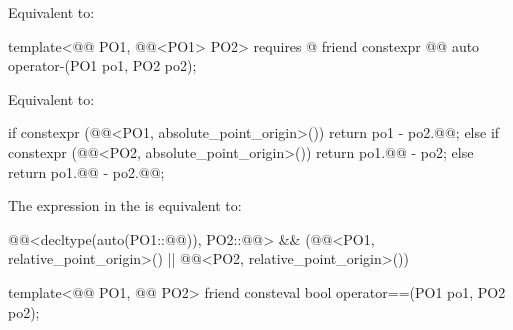 \begin{itemdescr}
\pnum
\effects
Equivalent to:
\end{itemdescr}

\begin{itemdecl}
template<@@ PO1, @@<PO1{}> PO2>
  requires @\seebelownc@
friend constexpr @@ auto operator-(PO1 po1, PO2 po2);
\end{itemdecl}

\begin{itemdescr}
\pnum
\effects
Equivalent to:
\begin{codeblock}
if constexpr (@@<PO1, absolute_point_origin>()) {
  return po1 - po2.@@;
} else if constexpr (@@<PO2, absolute_point_origin>()) {
  return po1.@@ - po2;
} else {
  return po1.@@ - po2.@@;
}
\end{codeblock}

\pnum
\remarks
The expression in the  is equivalent to:
\begin{codeblock}
@@<decltype(auto(PO1::@@)), PO2::@@> &&
  (@@<PO1, relative_point_origin>() ||
   @@<PO2, relative_point_origin>())
\end{codeblock}
\end{itemdescr}

\begin{itemdecl}
template<@@ PO1, @@ PO2>
friend consteval bool operator==(PO1 po1, PO2 po2);
\end{itemdecl}

